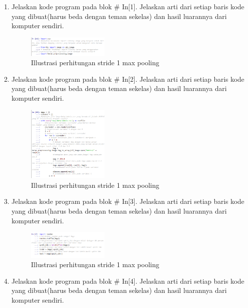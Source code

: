 \begin{enumerate}
\item Jelaskan kode program pada blok \# In[1]. Jelaskan arti dari setiap baris kode yang dibuat(harus beda dengan teman sekelas) dan hasil luarannya dari komputer sendiri.

\begin{figure}[H]
    \includegraphics[width=4cm]{figures/1174003/7/praktek_1.png}
    \centering
    \caption{Illustrasi perhitungan stride 1 max pooling}
\end{figure}
\item Jelaskan kode program pada blok \# In[2]. Jelaskan arti dari setiap baris kode yang dibuat(harus beda dengan teman sekelas) dan hasil luarannya dari komputer sendiri.

\begin{figure}[H]
    \includegraphics[width=4cm]{figures/1174003/7/praktek_2.png}
    \centering
    \caption{Illustrasi perhitungan stride 1 max pooling}
\end{figure}
\item Jelaskan kode program pada blok \# In[3]. Jelaskan arti dari setiap baris kode yang dibuat(harus beda dengan teman sekelas) dan hasil luarannya dari komputer sendiri.

\begin{figure}[H]
    \includegraphics[width=4cm]{figures/1174003/7/praktek_3.png}
    \centering
    \caption{Illustrasi perhitungan stride 1 max pooling}
\end{figure}
\item Jelaskan kode program pada blok \# In[4]. Jelaskan arti dari setiap baris kode yang dibuat(harus beda dengan teman sekelas) dan hasil luarannya dari komputer sendiri.

\end{enumerate}
